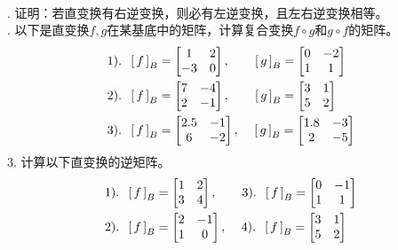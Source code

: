 \documentclass[12pt,UTF8,fontset=none]{ctexbook}
\begin{document}
\begin{xt}
    \mbox{} \\
    . 证明：若直变换有右逆变换，则必有左逆变换，且左右逆变换相等。\\
    . 以下是直变换$f,g$在某基底中的矩阵，计算复合变换$f\circ g$和$g\circ f$的矩阵。
    \begin{align*}
        1). \;\;\bmat{f}[B] &= 
        \begin{bmatrix}
            1 & 2 \\ -3 & 0
        \end{bmatrix},\qquad
        \bmat{g}[B] = 
        \begin{bmatrix}
            0 & -2 \\ 1 & 1
        \end{bmatrix} \\
        2). \;\;\bmat{f}[B] &= 
        \begin{bmatrix}
            7 & -4 \\ 2 & -1
        \end{bmatrix},\qquad
        \bmat{g}[B] = 
        \begin{bmatrix}
            3 & 1 \\ 5 & 2
        \end{bmatrix} \\
        3). \;\;\bmat{f}[B] &= 
        \begin{bmatrix}
            2.5 & -1 \\ 6 & -2
        \end{bmatrix},\quad\,
        \bmat{g}[B] = 
        \begin{bmatrix}
            1.8 & -3 \\ 2 & -5
        \end{bmatrix}
    \end{align*}
    3. 计算以下直变换的逆矩阵。
    \begin{align*}
        1). \;\;\bmat{f}[B] &= 
        \begin{bmatrix}
            1 & 2 \\ 3 & 4
        \end{bmatrix},\qquad
        3).\;\;\bmat{f}[B] = 
        \begin{bmatrix}
            0 & -1 \\ 1 & 1
        \end{bmatrix} \\
        2). \;\;\bmat{f}[B] &= 
        \begin{bmatrix}
            2 & -1 \\ 1 & 0
        \end{bmatrix},\quad\,
        4).\;\;\bmat{f}[B] = 
        \begin{bmatrix}
            3 & 1 \\ 5 & 2
        \end{bmatrix} 
    \end{align*}

\end{xt}
\end{document}
